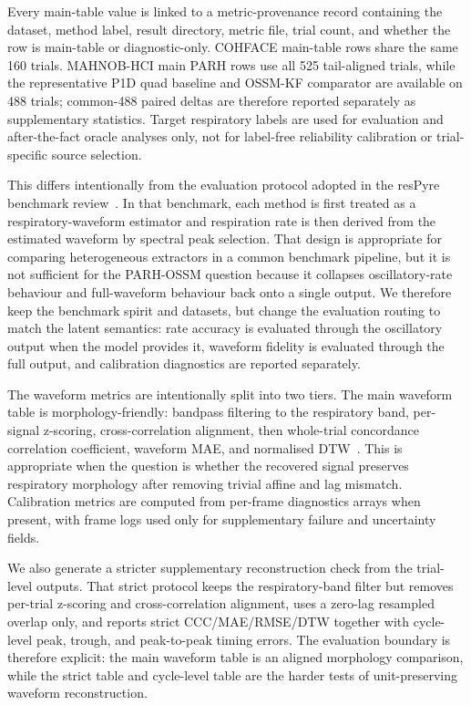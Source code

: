 \documentclass[fleqn,10pt]{wlscirep}
\begin{document}
Every main-table value is linked to a metric-provenance record containing the
dataset, method label, result directory, metric file, trial count, and whether
the row is main-table or diagnostic-only. COHFACE main-table rows share the same
160 trials. MAHNOB-HCI main PARH rows use all 525 tail-aligned trials, while
the representative P1D quad baseline and OSSM-KF comparator are available on
488 trials; common-488 paired deltas are therefore reported separately as
supplementary statistics. Target respiratory labels are used for evaluation and
after-the-fact oracle analyses only, not for label-free reliability calibration or
trial-specific source selection.

This differs intentionally from the evaluation protocol adopted in the
resPyre benchmark review~\cite{Boccignone2025Review}. In that benchmark,
each method is first treated as a respiratory-waveform estimator and
respiration rate is then derived from the estimated waveform by spectral peak
selection. That design is appropriate for comparing heterogeneous extractors in
a common benchmark pipeline, but it is not sufficient for the PARH-OSSM
question because it collapses oscillatory-rate behaviour and full-waveform
behaviour back onto a single output. We therefore keep the benchmark spirit
and datasets, but change the evaluation routing to match the latent semantics:
rate accuracy is evaluated through the oscillatory output when the model
provides it, waveform fidelity is evaluated through the full output, and
calibration diagnostics are reported separately.

The waveform metrics are intentionally split into two tiers. The main waveform
table is morphology-friendly: bandpass filtering to the respiratory band,
per-signal z-scoring, cross-correlation alignment, then whole-trial
concordance correlation coefficient, waveform MAE, and normalised
DTW~\cite{LinCCC1989}. This is appropriate when the question is whether the
recovered signal preserves respiratory morphology after removing trivial affine
and lag mismatch. Calibration metrics are computed from per-frame
diagnostics arrays when present, with frame logs used only for supplementary
failure and uncertainty fields.

We also generate a stricter supplementary reconstruction check from the
trial-level outputs. That strict protocol keeps the respiratory-band
filter but removes per-trial z-scoring and cross-correlation alignment, uses a
zero-lag resampled overlap only, and reports strict CCC/MAE/RMSE/DTW together
with cycle-level peak, trough, and peak-to-peak timing errors. The evaluation
boundary is therefore explicit: the main waveform table is an aligned
morphology comparison, while the strict table and cycle-level table are the
harder tests of unit-preserving waveform reconstruction.
\end{document}
